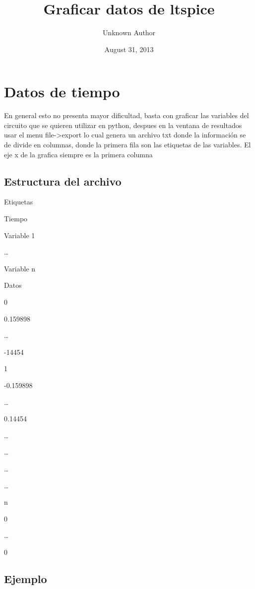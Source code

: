 \documentclass[letterpaper,10pt,english]{/usr/lib/python3.3/site-packages/sphinx/texinputs/sphinxhowto}
\title{Graficar datos de ltspice}
\date{August 31, 2013}
\author{Unknown Author}
\begin{document}
        
            \maketitle
        

        


        
        \section{Datos de tiempo}

En general esto no presenta mayor dificultad, basta con graficar las
variables del circuito que se quieren utilizar en python, despues en la
ventana de resultados usar el menu file-\textgreater{}export lo cual
genera un archivo txt donde la información se de divide en columnas,
donde la primera fila son las etiquetas de las variables. El eje x de la
grafica siempre es la primera columna

\subsection{Estructura del archivo}

Etiquetas

Tiempo

Variable 1

\ldots{}

Variable n

Datos

0

0.159898

\ldots{}

-14454

1

-0.159898

\ldots{}

0.14454

\ldots{}

\ldots{}

\ldots{}

\ldots{}

n

0

\ldots{}

0

\subsection{Ejemplo}

\end{document}

